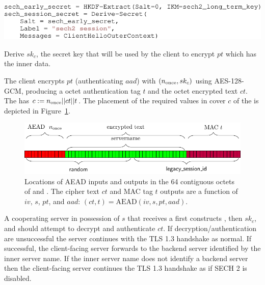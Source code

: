 \begin{listing}[htb]
\centering
\includegraphics[width=\linewidth]{figure/sech2-derive-secret.pdf}
\captionsetup{width=.8\linewidth} 
\caption[SECH 2 Derive Secret]{Derive $sk_c$, the secret key that will be used by the client to encrypt $pt$ which has the inner  data.}
\label{lst:sech2-derive-secret}
\end{listing}

The client encrypts $pt$ (authenticating $aad$) with $(\nonce,sk_c)$ using AES-128-GCM, producing a \sechtwotaglen{} octet authentication tag $t$ and the \sechtwocipherlen{} octet encrypted text $ct$. The \var{\ClientHelloOuter} has $c:=\nonce||ct||t$. The placement of the required values in cover $c$ of the \var{\ClientHelloOuter} is depicted in Figure~\ref{fig:sech2-cover}.

\begin{figure}[htb]
\centering
\includegraphics[width=\linewidth]{figure/sech2-cover.pdf}
\captionsetup{width=.8\linewidth} 
\caption[SECH 2 Cover]{Locations of AEAD inputs and outputs in the 64 contiguous octets of   and . The cipher text $ct$ and MAC tag $t$ outputs are a function of $iv$, $s$, $pt$, and $aad$: $(ct,t)=\text{AEAD}(iv,s,pt,aad)$.}
\label{fig:sech2-cover}
\end{figure}

A cooperating server in possession of $s$ that receives a  first constructs , then $sk_c$, and should attempt to decrypt and authenticate $ct$. If decryption/authentication are unsuccessful the server continues with the TLS 1.3 handshake as normal. If successful, the client-facing server forwards  to the backend server identified by the inner server name. If the inner server name does not identify a backend server then the client-facing server continues the TLS 1.3 handshake as if SECH 2 is disabled.

